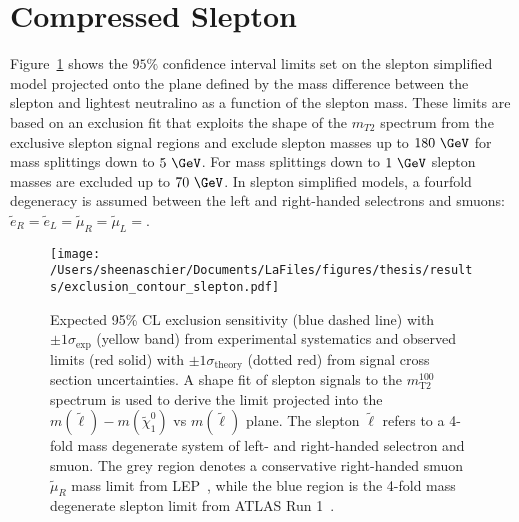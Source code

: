 { \section{Compressed Slepton}
 Figure~\ref{fig:exclusion_contour_slepton} shows the $95\%$ confidence interval limits set on the slepton simplified model projected onto the plane defined by the mass difference between the slepton and lightest neutralino as a function of the slepton mass.  These limits are based on an exclusion fit that exploits the shape of the $m_{T2}$ spectrum from the exclusive slepton signal regions and exclude slepton masses up to $180~\GeV$ for mass splittings down to $5~\GeV$.  For mass splittings down to $1~\GeV$ slepton masses are excluded up to $70~\GeV$.  In slepton simplified models, a fourfold degeneracy is assumed between the left and right-handed selectrons and smuons: $\tilde{e}_R=\tilde{e}_L=\tilde{\mu}_R=\tilde{\mu}_L=$.
  \begin{figure}
 \centering
 \texttt{[image: /Users/sheenaschier/Documents/LaFiles/figures/thesis/results/exclusion\_contour\_slepton.pdf]}
  \caption{
Expected 95\% CL exclusion sensitivity (blue dashed line) with $\pm 1 \sigma_\text{exp}$ (yellow band) from experimental systematics
and observed limits (red solid) with $\pm 1 \sigma_\text{theory}$ (dotted red) from signal cross section uncertainties.
A shape fit of slepton signals to the $m_\text{T2}^{100}$ spectrum is used to derive
the limit projected into the $m(\tilde{\ell}) - m(\tilde{\chi}^0_1)$ vs $m(\tilde{\ell})$ plane.
The slepton $\tilde{\ell}$ refers to a 4-fold mass degenerate system of left- and right-handed selectron and smuon.
The grey region denotes a conservative right-handed smuon $\tilde{\mu}_R$ mass limit from LEP~\cite{LEPlimits},
while the blue region is the 4-fold mass degenerate slepton limit from ATLAS Run 1~\cite{SUSY-2013-11}.}
   \label{fig:exclusion_contour_slepton}
 \end{figure}
  \FloatBarrier
}
